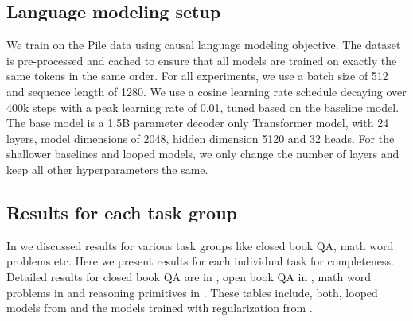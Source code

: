 




\subsection{Language modeling setup}
\label{sec:apx_language_modeling}

We train on the Pile data using causal language modeling objective. The dataset is pre-processed and cached to ensure that all models are trained on exactly the same tokens in the same order.
For all experiments, we use a batch size of 512 and sequence length of 1280.
We use a cosine learning rate schedule decaying over 400k steps with a peak learning rate of 0.01, tuned based on the baseline model.
The base model is a 1.5B parameter decoder only Transformer model, with 24 layers, model dimensions of 2048, hidden dimension 5120 and 32 heads.
For the shallower baselines and looped models, we only change the number of layers and keep all other hyperparameters the same.



\subsection{Results for each task group}

In  we discussed results for various task groups like closed book QA, math word problems etc. Here we present results for each individual task for completeness.
Detailed results for closed book QA are in , open book QA in , math word problems in  and reasoning primitives in .
These tables include, both, looped models from  and the models trained with regularization from .














